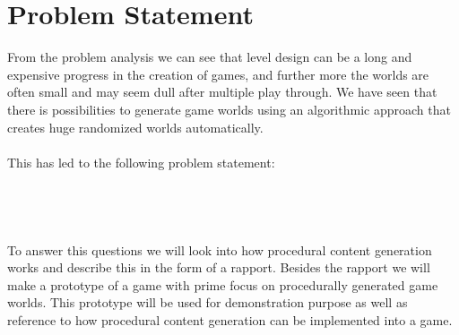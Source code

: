 \section{Problem Statement}

From the problem analysis we can see that level design can be a long and expensive progress in the creation of games, and further more the worlds are often small and may seem dull after multiple play through. We have seen that there is possibilities to generate game worlds using an algorithmic approach that creates huge randomized worlds automatically.
\\\\
This has led to the following problem statement:
\\\\
\noindent{}
\\\\\\
To answer this questions we will look into how procedural content generation works and describe this in the form of a rapport. Besides the rapport we will make a prototype of a game with prime focus on procedurally generated game worlds. This prototype will be used for demonstration purpose as well as reference to how procedural content generation can be implemented into a game.